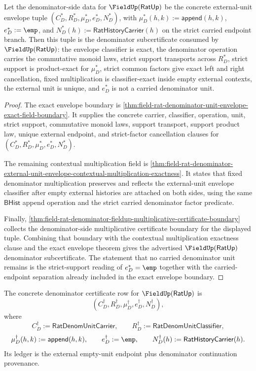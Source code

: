 \begin{theorem}
\label{thm:ratup-fieldup-denominator-certificate-assembly}
Let the denominator-side data for $\FieldUp(\mathsf{RatUp})$ be the concrete
external-unit envelope tuple
$(C_D^\ast,R_D^\ast,\mu_D^\ast,e_D^\ast,N_D^\ast)$, with
$\mu_D^\ast(h,k):=\mathsf{append}(h,k)$, $e_D^\ast:=\emp$, and
$N_D^\ast(h):=\mathsf{RatHistoryCarrier}(h)$ on the strict carried endpoint
branch. Then this tuple is the denominator subcertificate consumed by
$\FieldUp(\mathsf{RatUp})$: the envelope classifier is exact, the
denominator operation carries the commutative monoid laws, strict support
transports across $R_D^\ast$, strict support is product-exact for
$\mu_D^\ast$, strict common factors give exact left and right cancellation,
fixed multiplication is classifier-exact inside empty external contexts, the
external unit is unique, and $e_D^\ast$ is not a carried denominator unit.
\end{theorem}
\begin{proof}
The exact envelope boundary is
\autoref{thm:field-rat-denominator-unit-envelope-exact-field-boundary}. It
supplies the concrete carrier, classifier, operation, unit, strict support,
commutative monoid laws, support transport, support product law, unique
external endpoint, and strict-factor cancellation clauses for
$(C_D^\ast,R_D^\ast,\mu_D^\ast,e_D^\ast,N_D^\ast)$.

The remaining contextual multiplication field is
\autoref{thm:field-rat-denominator-external-unit-envelope-contextual-multiplication-exactness}.
It states that fixed denominator multiplication preserves and reflects the
external-unit envelope classifier after empty external histories are attached
on both sides, using the same $\mathsf{BHist}$ append operation and the strict
carried denominator factor predicate.

Finally,
\autoref{thm:field-rat-denominator-fieldup-multiplicative-certificate-boundary}
collects the denominator-side multiplicative certificate boundary for the
displayed tuple. Combining that boundary with the contextual multiplication
exactness clause and the exact envelope theorem gives the advertised
$\FieldUp(\mathsf{RatUp})$ denominator subcertificate. The statement that no
carried denominator unit remains is the strict-support reading of
$e_D^\ast=\emp$ together with the carried-endpoint separation already included
in the exact envelope boundary.
\end{proof}

\begin{definition}
\label{def:ratup-fieldup-denominator-certificate-row}
The concrete denominator certificate row for $\FieldUp(\mathsf{RatUp})$ is
$$
(C_D^\dagger,R_D^\dagger,\mu_D^\dagger,e_D^\dagger,N_D^\dagger),
$$
where
$$
C_D^\dagger:=\mathsf{RatDenomUnitCarrier},\qquad
R_D^\dagger:=\mathsf{RatDenomUnitClassifier},
$$
$$
\mu_D^\dagger(h,k):=\mathsf{append}(h,k),\qquad
e_D^\dagger:=\emp,\qquad
N_D^\dagger(h):=\mathsf{RatHistoryCarrier}(h).
$$
Its ledger is the external empty-unit endpoint plus denominator continuation
provenance.
\end{definition}

